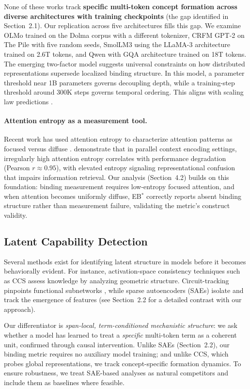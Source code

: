 \documentclass[10pt]{article} %
\begin{document}
None of these works track \textbf{specific multi-token concept formation across diverse architectures with training checkpoints} (the gap identified in Section~2.1).
Our replication across five architectures fills this gap. We examine OLMo trained on the Dolma corpus with a different tokenizer, CRFM GPT-2 on The Pile with five random seeds, SmolLM3 using the LLaMA-3 architecture trained on 2.6T tokens, and Qwen with GQA architecture trained on 18T tokens.
The emerging two-factor model suggests universal constraints on how distributed representations supersede localized binding structure. In this model, a parameter threshold near 1B parameters governs decoupling depth, while a training-step threshold around 300K steps governs temporal ordering. This aligns with scaling law predictions \citep{kaplan2020scaling}.

\paragraph{Attention entropy as a measurement tool.}
Recent work has used attention entropy to characterize attention patterns as focused versus diffuse \citep{clark2019what}.
\citet{zhang-etal-2025-attention} demonstrate that in parallel context encoding settings, irregularly high attention entropy correlates with performance degradation (Pearson $r\approx0.95$), with elevated entropy signaling representational confusion that impairs information retrieval.
Our analysis (Section~4.2) builds on this foundation: binding measurement requires low-entropy focused attention, and when attention becomes uniformly diffuse, EB$^*$ correctly reports absent binding structure rather than measurement failure, validating the metric's construct validity.

\subsection{Latent Capability Detection}

Several methods exist for identifying latent structure in models before it becomes behaviorally evident.
For instance, activation-space consistency techniques such as CCS \citep{burns2022discovering} assess knowledge by analyzing geometric structure.
Circuit-tracking pinpoints functional subnetworks \citep{wang2023interpretability}, while sparse autoencoders (SAEs) isolate and track the emergence of features (see Section~2.2 for a detailed contrast with our approach).

Our differentiator is \emph{span-local, term-conditioned mechanistic structure}: we ask whether a model has learned to treat a \emph{specific} multi-token term as a coherent unit, confirmed through causal intervention.
Unlike SAEs (Section~2.2), our binding metric requires no auxiliary model training; and unlike CCS, which probes global representations, we track concept-specific formation dynamics.
To ensure robustness, we treat SAE-based analyses as natural competitors and include them as baselines where feasible.
\end{document}
